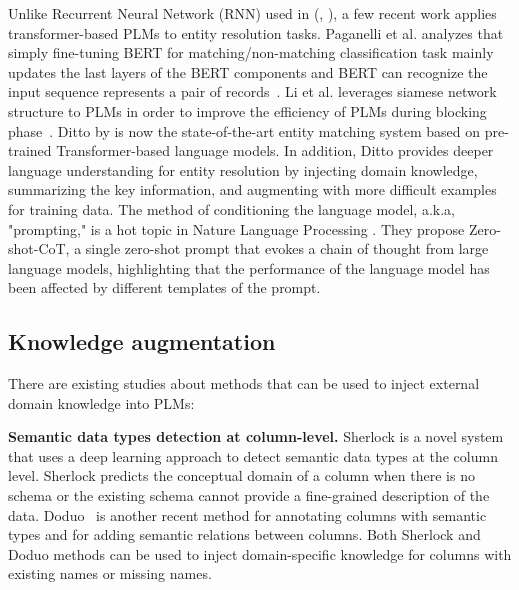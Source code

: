 Unlike Recurrent Neural Network (RNN) used in (\cite{zhao_auto-em_2019}, \cite{mudgal_deep_2018}), a few recent work applies transformer-based PLMs to entity resolution tasks. Paganelli et al. analyzes that simply fine-tuning BERT for matching/non-matching classification task mainly updates the last layers of the BERT components and BERT can recognize the input sequence represents a pair of records~\cite{paganelli_analyzing_2022}. Li et al. leverages siamese network structure to PLMs in order to improve the efficiency of PLMs during blocking phase~\cite{li_improving_2021}. 
Ditto by \cite{li_deep_2020} is now the state-of-the-art entity matching system based on pre-trained Transformer-based language models. In addition, Ditto provides deeper language understanding for entity resolution by injecting domain knowledge, summarizing the key information, and augmenting with more difficult examples for training data. The method of conditioning the language model, a.k.a, "prompting," is a hot topic in Nature Language Processing \cite{kojima_large_2022}. They \cite{kojima_large_2022} propose Zero-shot-CoT, a single zero-shot prompt that evokes a chain of thought from large language models, highlighting that the performance of the language model has been affected by different templates of the prompt. 
\vspace{-0.5em}
\subsection{Knowledge augmentation}
There are existing studies about methods that can be used to inject external domain knowledge into PLMs: 


\textbf{Semantic data types detection at column-level.}
Sherlock \cite{hulsebos_sherlock_2019} is a novel system that uses a deep learning approach to detect semantic data types at the column level. Sherlock predicts the conceptual domain of a column when there is no schema or the existing schema cannot provide a fine-grained description of the data. Doduo~\cite{suhara_annotating_2022} is another recent method for annotating  columns with semantic types and for adding semantic relations between columns. Both Sherlock and Doduo methods can be used to inject domain-specific knowledge for columns with existing names or missing names.


